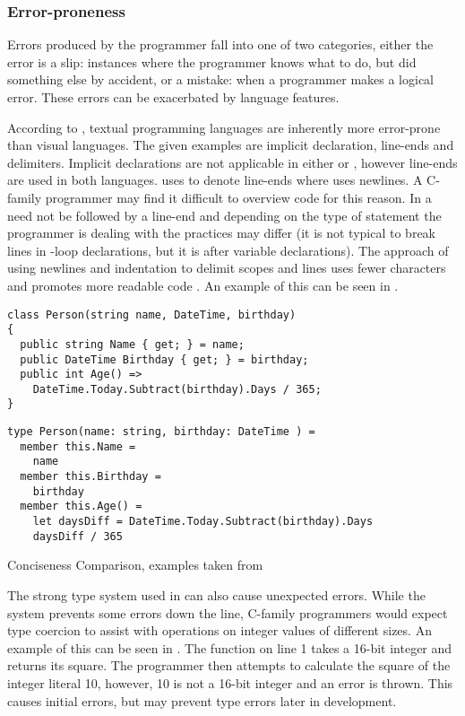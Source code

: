 \subsubsection{Error-proneness}
Errors produced by the programmer fall into one of two categories, either the error is a slip: instances where the programmer knows what to do, but did something else by accident, or a mistake: when a programmer makes a logical error. These errors can be exacerbated by language features.

According to \cite{green1996usability}, textual programming languages are inherently more error-prone than visual languages. The given examples are implicit declaration, line-ends and delimiters. Implicit declarations are not applicable in either \cs or \fs, however line-ends are used in both languages. \cs uses \m{;} to denote line-ends where \fs uses newlines. A C-family programmer may find it difficult to overview \fs code for this reason. In \cs a \m{;} need not be followed by a line-end and depending on the type of statement the programmer is dealing with the practices may differ (it is not typical to break lines in -loop declarations, but it is after variable declarations). The \fs approach of using newlines and indentation to delimit scopes and lines uses fewer characters and promotes more readable code \needcite{}. An example of this can be seen in .

\begin{listing}[H]
\begin{verbatim}
class Person(string name, DateTime, birthday)
{
  public string Name { get; } = name;
  public DateTime Birthday { get; } = birthday;
  public int Age() =>
    DateTime.Today.Subtract(birthday).Days / 365;
}
\end{verbatim}
\begin{verbatim}
type Person(name: string, birthday: DateTime ) =
  member this.Name =
    name
  member this.Birthday =
    birthday
  member this.Age() =
    let daysDiff = DateTime.Today.Subtract(birthday).Days
    daysDiff / 365
\end{verbatim}
\caption{Conciseness Comparison, examples taken from \cite{wlaschin2017FsharpForCsharpProgrammers}}
\label{lst:con-comp}
\end{listing}

The strong type system used in \fs can also cause unexpected errors. While the system prevents some errors down the line, C-family programmers would expect type coercion to assist with operations on integer values of different sizes. An example of this can be seen in . The function on line 1 takes a 16-bit integer and returns its square. The programmer then attempts to calculate the square of the integer literal 10, however, 10 is not a 16-bit integer and an error is thrown. This causes initial errors, but may prevent type errors later in development\cite{ray2014large}.

